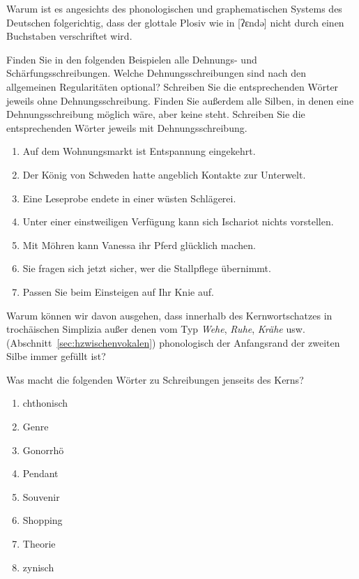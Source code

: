  \label{exc:phonologischeschreibprinzipien03} Warum ist es angesichts des phonologischen und graphematischen Systems des Deutschen folgerichtig, dass der glottale Plosiv wie in [ʔɛndə] nicht durch einen Buchstaben verschriftet wird.

 \label{exc:phonologischeschreibprinzipien04} Finden Sie in den folgenden Beispielen alle Dehnungs- und Schärfungsschreibungen.
Welche Dehnungsschreibungen sind nach den allgemeinen Regularitäten optional?
Schreiben Sie die entsprechenden Wörter jeweils ohne Dehnungsschreibung.
Finden Sie außerdem alle Silben, in denen eine Dehnungsschreibung möglich wäre, aber keine steht.
Schreiben Sie die entsprechenden Wörter jeweils mit Dehnungsschreibung.

\begin{enumerate}
  \item Auf dem Wohnungsmarkt ist Entspannung eingekehrt.
  \item Der König von Schweden hatte angeblich Kontakte zur Unterwelt.
  \item Eine Leseprobe endete in einer wüsten Schlägerei.
  \item Unter einer einstweiligen Verfügung kann sich Ischariot nichts vorstellen.
  \item Mit Möhren kann Vanessa ihr Pferd glücklich machen.
  \item Sie fragen sich jetzt sicher, wer die Stallpflege übernimmt.
  \item Passen Sie beim Einsteigen auf Ihr Knie auf.
\end{enumerate}

 \label{exc:phonologischeschreibprinzipien05} Warum können wir davon ausgehen, dass innerhalb des Kernwortschatzes in trochäischen Simplizia außer denen vom Typ \textit{Wehe}, \textit{Ruhe}, \textit{Krähe} usw. (Abschnitt~\ref{sec:hzwischenvokalen}) phonologisch der Anfangsrand der zweiten Silbe immer gefüllt ist?

 \label{exc:phonologischeschreibprinzipien06} Was macht die folgenden Wörter zu Schreibungen jenseits des Kerns?

\begin{enumerate}
  \item chthonisch
  \item Genre
  \item Gonorrhö
  \item Pendant
  \item Souvenir
  \item Shopping
  \item Theorie
  \item zynisch
\end{enumerate}

